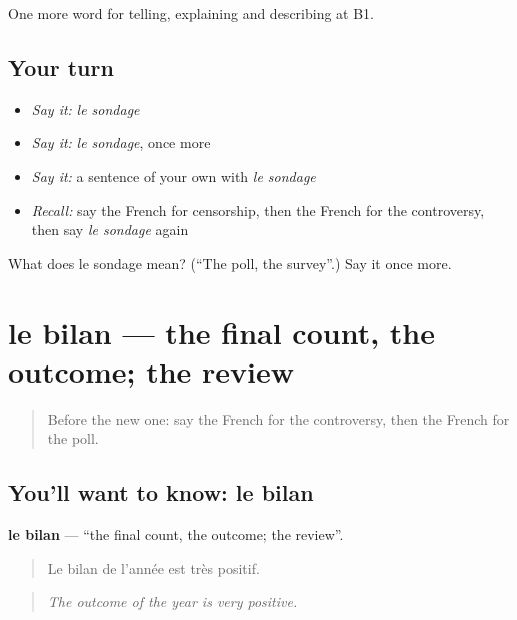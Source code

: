 \begin{grammarlens}[title={What you've built}]
One more word for telling, explaining and describing at B1.
\end{grammarlens}

\subsection*{Your turn}
\begin{itemize}
\raggedright
  \item \emph{Say it:} \emph{le sondage}
  \item \emph{Say it:} \emph{le sondage}, once more
  \item \emph{Say it:} a sentence of your own with \emph{le sondage}
  \item \emph{Recall:} say the French for censorship, then the French for the controversy, then say \emph{le sondage} again
\end{itemize}

\begin{tcolorbox}[breakable,colback=teal!4,colframe=teal!35!black,title={Before you move on}]
What does le sondage mean? (\textquotedblleft{}The poll, the survey\textquotedblright{}.) Say it once more.
\end{tcolorbox}
\section[le bilan]{le bilan — the final count, the outcome; the review}

\label{lesson:FR-C286-bilan}



\begin{quote}
Before the new one: say the French for the controversy, then the French for the poll.
\end{quote}

\subsection*{You'll want to know: le bilan}
\textbf{le bilan} — \textquotedblleft{}the final count, the outcome; the review\textquotedblright{}.

\begin{quote}
Le bilan de l'année est très positif.
\end{quote}

\begin{quote}
\emph{The outcome of the year is very positive.}
\end{quote}

